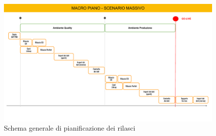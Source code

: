         \begin{figure}
            \centering
            \includegraphics[width=\linewidth]{figures/pianoRilasci.pdf}
            \caption{Schema generale di pianificazione dei rilasci}
            \label{fig:schema-rilasci}
        \end{figure}

